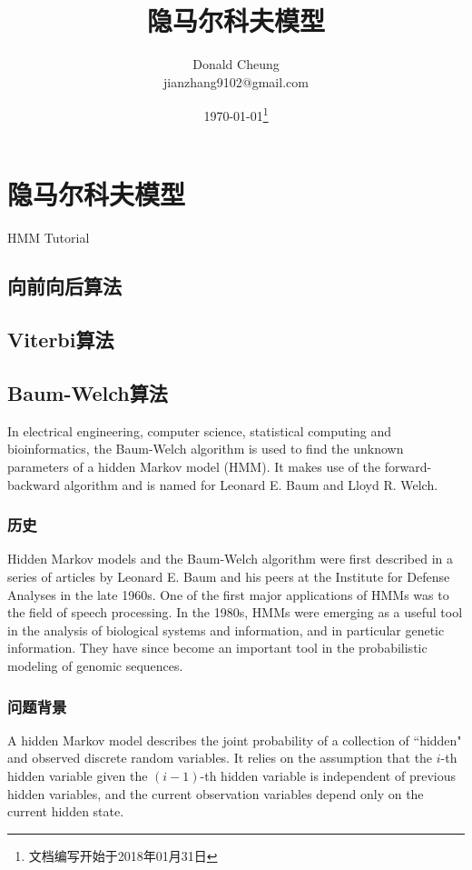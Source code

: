 \ifx\mlnotes\undefined
    \providecommand{\notesroot}{../..}
    \providecommand{\hmmroot}{.}

    \title{隐马尔科夫模型}
    \author{Donald Cheung\\jianzhang9102@gmail.com}
    \date{\today\footnote{文档编写开始于2018年01月31日}}

    
\else
    \providecommand{\fmroot}{\mlroot/hmm}
\fi

\chapter{隐马尔科夫模型}

HMM Tutorial\cite{Rabiner:HMMTutorial}

\section{向前向后算法}

\section{Viterbi算法}

\section{Baum-Welch算法}
In electrical engineering, computer science, statistical computing and bioinformatics, the Baum-Welch algorithm is used to find the unknown parameters of a hidden Markov model (HMM). It makes use of the forward-backward algorithm and is named for Leonard E. Baum and Lloyd R. Welch.

\subsection{历史}
Hidden Markov models and the Baum-Welch algorithm were first described in a series of articles by Leonard E. Baum and his peers at the Institute for Defense Analyses in the late 1960s. One of the first major applications of HMMs was to the field of speech processing. In the 1980s, HMMs were emerging as a useful tool in the analysis of biological systems and information, and in particular genetic information. They have since become an important tool in the probabilistic modeling of genomic sequences.

\subsection{问题背景}
A hidden Markov model describes the joint probability of a collection of ``hidden" and observed discrete random variables.
It relies on the assumption that the $i$-th hidden variable given the $(i-1)$-th hidden variable is independent of previous hidden variables, and the current observation variables depend only on the current hidden state.

